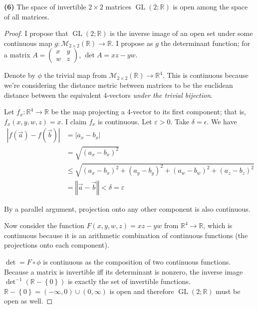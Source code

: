 \documentclass{article}
\newcommand{\R}{\mathbb{R}}
\newcommand{\abs}[1]{\left| #1 \right|}
\newcommand{\set}[1]{\left\{ #1 \right\}}
\newcommand{\norm}[1]{\left\Vert #1 \right\Vert}
\DeclareMathOperator{\GL}{GL}
\begin{document}
\textbf{(6) }
The space of invertible $2\times 2$ matrices $\GL(2; \R)$ is open among the space of all matrices.
\begin{proof}
    I propose that $\GL(2; \R)$ is the inverse image of an open set under some continuous map $g: \mathcal{M}_{2 \times 2}(\R) \to \R$. I propose as $g$ the determinant function; for a matrix $A = \begin{pmatrix}x & y \\ w & z\end{pmatrix}$, $\det A = xz - yw$.

    Denote by $\phi$ the trivial map from $\mathcal{M}_{2 \times 2}(\R) \to \R^4$. This is continuous because we're considering the distance metric between matrices to be the euclidean distance between the equivalent 4-vectors \textit{under the trivial bijection}.

    Let $f_x : \R^4 \to \R$ be the map projecting a 4-vector to its first component; that is, $f_x(x, y, w, z) = x$. I claim $f_x$ is continuous. Let $\varepsilon > 0$. Take $\delta = \epsilon$. We have
    \begin{align*}
        \abs{f(\vec{a}) - f(\vec{b})} &= \abs{a_x - b_x} \\
        &= \sqrt{(a_x - b_x)^2} \\
        &\le \sqrt{(a_x - b_x)^2 + (a_y - b_y)^2 + (a_w - b_w)^2 + (a_z - b_z)^2} \\
        &= \norm{\vec{a} - \vec{b}} < \delta = \varepsilon
    \end{align*}

    By a parallel argument, projection onto any other component is also continuous.

    Now consider the function $F(x, y, w, z) = xz - yw$ from $\R^4 \to \R$, which is continuous because it is an arithmetic combination of continuous functions (the projections onto each component).

    $\det = F \circ \phi$ is continuous as the composition of two continuous functions. Because a matrix is invertible iff its determinant is nonzero, the inverse image $\det^{-1}(\R - \set{0})$ is exactly the set of invertible functions. $\R - \set{0} = (-\infty, 0) \cup (0, \infty)$ is open and therefore $\GL(2; \R)$ must be open as well.    
\end{proof}
\end{document}
